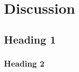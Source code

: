 \chapter[Discussion]{Discussion}
\label{Chap:Discussion}




\section{Heading 1}

\subsection{Heading 2}
\lipsum[4] %

